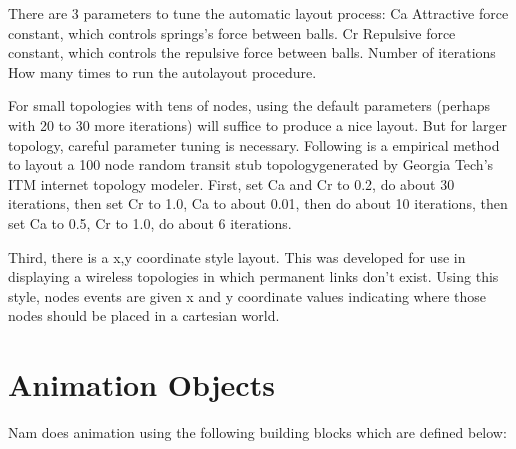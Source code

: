 There are 3 parameters to tune the automatic layout process: 
Ca  Attractive force constant, which controls springs's force between balls.
Cr  Repulsive force constant, which controls the repulsive force between balls.
Number of iterations How many times to run the autolayout procedure.

For small topologies with tens of nodes, using the default parameters (perhaps with 20 to 30 more iterations) will suffice to produce a nice layout. But for larger topology, careful parameter tuning is necessary. Following is a empirical method to layout a 100 node random transit stub topologygenerated  by  Georgia  Tech's ITM  internet  topology  modeler. First,  set Ca  and  Cr  to  0.2,  do about 30 iterations, then set Cr to 1.0, Ca to about 0.01, then do about 10 iterations, then set Ca to 0.5, Cr to 1.0, do about 6 iterations.

Third, there is a x,y coordinate style layout.  This was developed for use in displaying a wireless topologies in which permanent links don't exist.  Using this style, nodes events are given x and y coordinate values indicating where those nodes should be placed in a cartesian world.



\section{Animation Objects}

Nam does animation using the following building blocks which are defined below:

